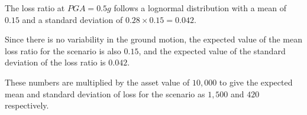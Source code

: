 The loss ratio at $PGA = 0.5 g$ follows a lognormal distribution with a mean of $0.15$ and a standard deviation of $0.28 \times 0.15 = 0.042$.

Since there is no variability in the ground motion, the expected value of the mean loss ratio for the scenario is also $0.15$, and the expected value of the standard deviation of the loss ratio is $0.042$.

These numbers are multiplied by the asset value of $10,000$ to give the expected mean and standard deviation of loss for the scenario as $1,500$ and $420$ respectively.
